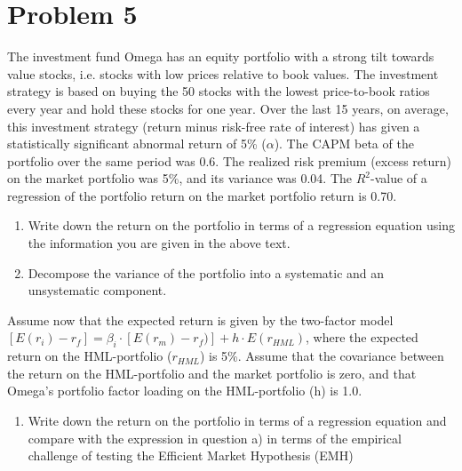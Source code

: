 \documentclass[12]{article}
\begin{document}
\section*{Problem 5}
The investment fund Omega has an equity portfolio with a strong tilt towards value stocks, i.e. stocks with low prices relative to book values. The investment strategy is based on buying the 50 stocks with the lowest price-to-book ratios every year and hold these stocks for one year. Over the last 15 years, on average, this investment strategy (return minus risk-free rate of interest) has given a statistically significant abnormal return of 5\% ($\alpha$). The CAPM beta of the portfolio over the same period was 0.6. The realized risk premium (excess return) on the market portfolio was 5\%, and its variance was 0.04. The $R^2$-value of a regression of the portfolio return on the market portfolio return is 0.70.
\begin{enumerate}
    \item[a)] Write down the return on the portfolio in terms of a regression equation using the information you are given in the above text.
    \item[b)] Decompose the variance of the portfolio into a systematic and an unsystematic component.
\end{enumerate}
\noindent
Assume now that the expected return is given by the two-factor model $[E(r_i) - r_f] = \beta_i\cdot[E(r_m) - r_f)] + h\cdot E(r_{HML})$, where the expected return on the HML-portfolio ($r_{HML}$) is 5\%. Assume that the covariance between the return on the HML-portfolio and the market portfolio is zero, and that Omega’s portfolio factor loading on the HML-portfolio (h) is 1.0.
\begin{enumerate}
    \item[c)] Write down the return on the portfolio in terms of a regression equation and compare with the expression in question a) in terms of the empirical challenge of testing the Efficient Market Hypothesis (EMH)
\end{enumerate}
    

\color{blue}
\end{document}
